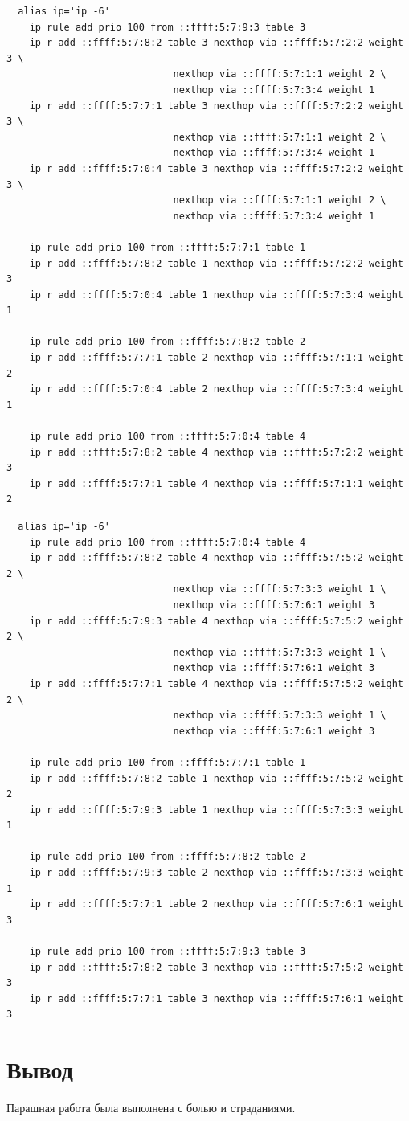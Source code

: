 \documentclass[11pt, a4paper] {ncc}
\begin{document}
\begin{verbatim}
  alias ip='ip -6'
    ip rule add prio 100 from ::ffff:5:7:9:3 table 3
    ip r add ::ffff:5:7:8:2 table 3 nexthop via ::ffff:5:7:2:2 weight 3 \
                             nexthop via ::ffff:5:7:1:1 weight 2 \
                             nexthop via ::ffff:5:7:3:4 weight 1
    ip r add ::ffff:5:7:7:1 table 3 nexthop via ::ffff:5:7:2:2 weight 3 \
                             nexthop via ::ffff:5:7:1:1 weight 2 \
                             nexthop via ::ffff:5:7:3:4 weight 1
    ip r add ::ffff:5:7:0:4 table 3 nexthop via ::ffff:5:7:2:2 weight 3 \
                             nexthop via ::ffff:5:7:1:1 weight 2 \
                             nexthop via ::ffff:5:7:3:4 weight 1
   
    ip rule add prio 100 from ::ffff:5:7:7:1 table 1
    ip r add ::ffff:5:7:8:2 table 1 nexthop via ::ffff:5:7:2:2 weight 3
    ip r add ::ffff:5:7:0:4 table 1 nexthop via ::ffff:5:7:3:4 weight 1

    ip rule add prio 100 from ::ffff:5:7:8:2 table 2
    ip r add ::ffff:5:7:7:1 table 2 nexthop via ::ffff:5:7:1:1 weight 2
    ip r add ::ffff:5:7:0:4 table 2 nexthop via ::ffff:5:7:3:4 weight 1

    ip rule add prio 100 from ::ffff:5:7:0:4 table 4
    ip r add ::ffff:5:7:8:2 table 4 nexthop via ::ffff:5:7:2:2 weight 3
    ip r add ::ffff:5:7:7:1 table 4 nexthop via ::ffff:5:7:1:1 weight 2
\end{verbatim}
\begin{verbatim}
  alias ip='ip -6'
    ip rule add prio 100 from ::ffff:5:7:0:4 table 4
    ip r add ::ffff:5:7:8:2 table 4 nexthop via ::ffff:5:7:5:2 weight 2 \
                             nexthop via ::ffff:5:7:3:3 weight 1 \
                             nexthop via ::ffff:5:7:6:1 weight 3
    ip r add ::ffff:5:7:9:3 table 4 nexthop via ::ffff:5:7:5:2 weight 2 \
                             nexthop via ::ffff:5:7:3:3 weight 1 \
                             nexthop via ::ffff:5:7:6:1 weight 3
    ip r add ::ffff:5:7:7:1 table 4 nexthop via ::ffff:5:7:5:2 weight 2 \
                             nexthop via ::ffff:5:7:3:3 weight 1 \
                             nexthop via ::ffff:5:7:6:1 weight 3

    ip rule add prio 100 from ::ffff:5:7:7:1 table 1
    ip r add ::ffff:5:7:8:2 table 1 nexthop via ::ffff:5:7:5:2 weight 2
    ip r add ::ffff:5:7:9:3 table 1 nexthop via ::ffff:5:7:3:3 weight 1

	ip rule add prio 100 from ::ffff:5:7:8:2 table 2
    ip r add ::ffff:5:7:9:3 table 2 nexthop via ::ffff:5:7:3:3 weight 1
    ip r add ::ffff:5:7:7:1 table 2 nexthop via ::ffff:5:7:6:1 weight 3

	ip rule add prio 100 from ::ffff:5:7:9:3 table 3
    ip r add ::ffff:5:7:8:2 table 3 nexthop via ::ffff:5:7:5:2 weight 3
    ip r add ::ffff:5:7:7:1 table 3 nexthop via ::ffff:5:7:6:1 weight 3
\end{verbatim}

\section*{Вывод}

Парашная работа была выполнена с болью и страданиями.
\end{document}

